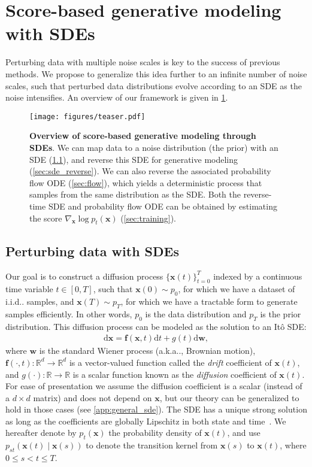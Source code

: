 \documentclass{article} \usepackage{iclr2021_conference,times}
\makeatletter
\newcommand{\mbb}[1]{\mathbb{#1}}
\newcommand{\ud}{\mathrm{d}}
\def\@onedot{\ifx\@let@token.\else.\null\fi\xspace}
\DeclareRobustCommand\onedot{\futurelet\@let@token\@onedot}
\newcommand{\bfx}{\mathbf{x}}
\newcommand{\bfw}{\mathbf{w}}
\newcommand{\bff}{\mathbf{f}}
\def\aka{a.k.a\onedot}
\def\iid{i.i.d\onedot}
\makeatother
\begin{document}
 \section{Score-based generative modeling with SDEs}
Perturbing data with multiple noise scales is key to the success of previous methods. We propose to generalize this idea further to an infinite number of noise scales, such that perturbed data distributions evolve according to an SDE as the noise intensifies. An overview of our framework is given in \cref{fig:toy}.

\begin{figure}
    \centering
    \texttt{[image: figures/teaser.pdf]}
    \caption{\textbf{Overview of score-based generative modeling through SDEs}. We can map data to a noise distribution (the prior) with an SDE (\cref{sec:sde_perturb}), and reverse this SDE for generative modeling (\cref{sec:sde_reverse}). We can also reverse the associated probability flow ODE (\cref{sec:flow}), which yields a deterministic process that samples from the same distribution as the SDE. Both the reverse-time SDE and probability flow ODE can be obtained by estimating the score $\nabla_\bfx \log p_t(\bfx)$ (\cref{sec:training}).}
    \label{fig:toy}
\end{figure}

\subsection{Perturbing data with SDEs}\label{sec:sde_perturb}
Our goal is to construct a diffusion process $\{\bfx(t)\}_{t=0}^T$ indexed by a continuous time variable $t\in [0,T]$, such that $\bfx(0) \sim p_{0}$, for which we have a dataset of \iid samples, and $\bfx(T) \sim p_T$, for which we have a tractable form to generate samples efficiently. In other words, $p_0$ is the data distribution and $p_T$ is the prior distribution. This diffusion process can be modeled as the solution to an It\^{o} SDE:
\begin{align}
    \ud \bfx = \bff(\bfx, t) \ud t + {g}(t) \ud \bfw, \label{eqn:forward_sde}
\end{align}
where $\bfw$ is the standard Wiener process (\aka, Brownian motion), $\bff(\cdot, t): \mbb{R}^d \to \mbb{R}^d$ is a vector-valued function called the \emph{drift} coefficient of $\bfx(t)$, and ${g}(\cdot): \mbb{R} \to \mbb{R}$ is a scalar function known as the \emph{diffusion} coefficient of $\bfx(t)$. For ease of presentation we assume the diffusion coefficient is a scalar (instead of a $d \times d$ matrix) and does not depend on $\bfx$, but our theory can be generalized to hold in those cases (see \cref{app:general_sde}). The SDE has a unique strong solution as long as the coefficients are globally Lipschitz in both state and time~\citep{oksendal2003stochastic}. We hereafter denote by $p_t(\bfx)$ the probability density of $\bfx(t)$, and use $p_{st}(\bfx(t) \mid \bfx(s))$ to denote the transition kernel from $\bfx(s)$ to $\bfx(t)$, where $0 \leq s < t \leq T$.
\end{document}
